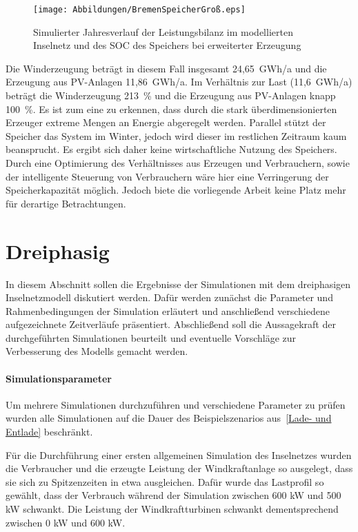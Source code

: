 \begin{figure}[H]
	\centering
	\texttt{[image: Abbildungen/BremenSpeicherGroß.eps]}
	\caption{Simulierter Jahresverlauf der Leistungsbilanz im modellierten Inselnetz und des SOC des Speichers bei erweiterter Erzeugung}
	\label{fig:BremenSpeicherGroß}
\end{figure}

Die Winderzeugung beträgt in diesem Fall insgesamt 24,65~GWh/a und die Erzeugung aus PV-Anlagen 11,86~GWh/a. Im Verhältnis zur Last (11,6~GWh/a) beträgt die Winderzeugung 213~\% und die Erzeugung aus PV-Anlagen knapp 100~\%. Es ist zum eine zu erkennen, dass durch die stark überdimensionierten Erzeuger extreme Mengen an Energie abgeregelt werden. Parallel stützt der Speicher das System im Winter, jedoch wird dieser im restlichen Zeitraum kaum beansprucht. Es ergibt sich daher keine wirtschaftliche Nutzung des Speichers. Durch eine Optimierung des Verhältnisses aus Erzeugen und Verbrauchern, sowie der intelligente Steuerung von Verbrauchern wäre hier eine Verringerung der Speicherkapazität möglich. Jedoch biete die vorliegende Arbeit keine Platz mehr für derartige Betrachtungen.
\section{Dreiphasig}

In diesem Abschnitt sollen die Ergebnisse der Simulationen mit dem dreiphasigen Inselnetzmodell diskutiert werden.
Dafür werden zunächst die Parameter und Rahmenbedingungen der Simulation erläutert und anschließend verschiedene 
aufgezeichnete Zeitverläufe präsentiert.
Abschließend soll die Aussagekraft der durchgeführten Simulationen beurteilt und eventuelle Vorschläge 
zur Verbesserung des Modells gemacht werden.

\paragraph{Simulationsparameter}
Um mehrere Simulationen durchzuführen und verschiedene Parameter zu prüfen wurden alle Simulationen auf die Dauer 
des Beispielszenarios aus~\ref{Lade- und Entlade} beschränkt.

Für die Durchführung einer ersten allgemeinen Simulation des Inselnetzes wurden die Verbraucher und die erzeugte
Leistung der Windkraftanlage so ausgelegt, dass sie sich zu Spitzenzeiten in etwa ausgleichen.
Dafür wurde das Lastprofil so gewählt, dass der Verbrauch während der Simulation zwischen 600 kW und 500 kW schwankt.
Die Leistung der Windkraftturbinen schwankt dementsprechend zwischen 0 kW und 600 kW.

